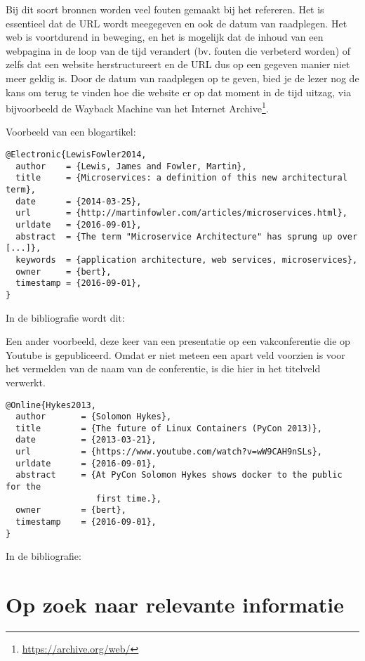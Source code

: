 Bij dit soort bronnen worden veel fouten gemaakt bij het refereren. Het is essentieel dat de URL wordt meegegeven en ook de datum van raadplegen. Het web is voortdurend in beweging, en het is mogelijk dat de inhoud van een webpagina in de loop van de tijd verandert (bv. fouten die verbeterd worden) of zelfs dat een website herstructureert en de URL dus op een gegeven manier niet meer geldig is. Door de datum van raadplegen op te geven, bied je de lezer nog de kans om terug te vinden hoe die website er op dat moment in de tijd uitzag, via bijvoorbeeld de Wayback Machine van het Internet Archive\footnote{\url{https://archive.org/web/}}.

Voorbeeld van een blogartikel:

\begin{verbatim}
@Electronic{LewisFowler2014,
  author    = {Lewis, James and Fowler, Martin},
  title     = {Microservices: a definition of this new architectural term},
  date      = {2014-03-25},
  url       = {http://martinfowler.com/articles/microservices.html},
  urldate   = {2016-09-01},
  abstract  = {The term "Microservice Architecture" has sprung up over [...]},
  keywords  = {application architecture, web services, microservices},
  owner     = {bert},
  timestamp = {2016-09-01},
}
\end{verbatim}

In de bibliografie wordt dit: 

Een ander voorbeeld, deze keer van een presentatie op een vakconferentie die op Youtube is gepubliceerd. Omdat er niet meteen een apart veld voorzien is voor het vermelden van de naam van de conferentie, is die hier in het titelveld verwerkt.

\begin{verbatim}
@Online{Hykes2013,
  author       = {Solomon Hykes},
  title        = {The future of Linux Containers (PyCon 2013)},
  date         = {2013-03-21},
  url          = {https://www.youtube.com/watch?v=wW9CAH9nSLs},
  urldate      = {2016-09-01},
  abstract     = {At PyCon Solomon Hykes shows docker to the public for the
                  first time.},
  owner        = {bert},
  timestamp    = {2016-09-01},
}
\end{verbatim}

In de bibliografie: 

\section{Op zoek naar relevante informatie}
\label{sec:op_zoek_naar_relevante_informatie}

